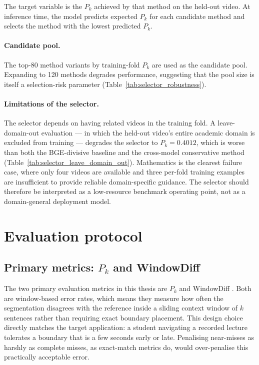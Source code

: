 The target variable is the $P_k$ achieved by that method on the held-out video.
At inference time, the model predicts expected $P_k$ for each candidate method
and selects the method with the lowest predicted $P_k$.

\paragraph{Candidate pool.}
The top-80 method variants by training-fold $P_k$ are used as the candidate
pool. Expanding to 120 methods degrades performance, suggesting that the pool
size is itself a selection-risk parameter (Table~\ref{tab:selector_robustness}).

\paragraph{Limitations of the selector.}
The selector depends on having related videos in the training fold.
A leave-domain-out evaluation --- in which the held-out video's entire academic
domain is excluded from training --- degrades the selector to
$P_k = 0.4012$, which is worse than both the BGE-divisive baseline and the
cross-model conservative method (Table~\ref{tab:selector_leave_domain_out}).
Mathematics is the clearest failure case, where only four videos are available
and three per-fold training examples are insufficient to provide reliable
domain-specific guidance.
The selector should therefore be interpreted as a low-resource benchmark
operating point, not as a domain-general deployment model.

\section{Evaluation protocol}
\label{sec:eval}

\subsection{Primary metrics: $P_k$ and WindowDiff}

The two primary evaluation metrics in this thesis are $P_k$
\citep{beeferman1999statistical} and WindowDiff \citep{pevzner2002critique}.
Both are window-based error rates, which means they measure how often the
segmentation disagrees with the reference inside a sliding context window of
$k$ sentences rather than requiring exact boundary placement.
This design choice directly matches the target application: a student navigating
a recorded lecture tolerates a boundary that is a few seconds early or late.
Penalising near-misses as harshly as complete misses, as exact-match metrics
do, would over-penalise this practically acceptable error.


